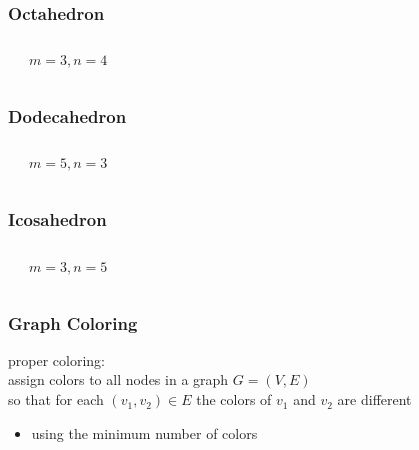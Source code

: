 \documentclass[dvipsnames]{beamer}
\begin{document}
\begin{frame}
  \frametitle{Octahedron}

  \begin{columns}
    \begin{center}
    \end{center}

    \begin{center}

      $m=3, n=4$
    \end{center}
  \end{columns}
\end{frame}

\begin{frame}
  \frametitle{Dodecahedron}

  \begin{columns}
    \begin{center}
    \end{center}

    \begin{center}

      $m=5, n=3$
    \end{center}
  \end{columns}
\end{frame}

\begin{frame}
  \frametitle{Icosahedron}

  \begin{columns}
    \begin{center}
    \end{center}

    $m=3, n=5$
  \end{columns}
\end{frame}

\begin{frame}
  \frametitle{Graph Coloring}

  \begin{definition}
    \alert{proper coloring}:\\
      assign colors to all nodes in a graph $G=(V,E)$\\
      so that for each $(v_1,v_2) \in E$ the colors of $v_1$ and $v_2$ are different

    \pause
    \begin{itemize}
      \item using the minimum number of colors
    \end{itemize}
  \end{definition}
\end{frame}
\end{document}
